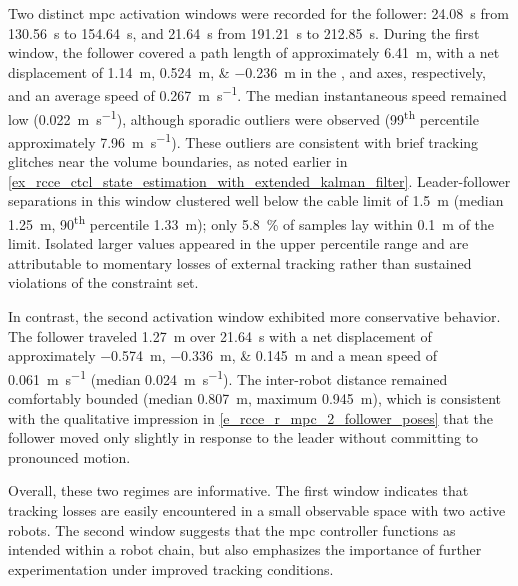 Two distinct \ac{mpc} activation windows were recorded for the follower: \qty{24.08}{\s} from
\qty{130.56}{\s} to \qty{154.64}{\s}, and \qty{21.64}{\s} from \qty{191.21}{\s} to
\qty{212.85}{\s}. During the first window, the follower covered a path length of approximately
\qty{6.41}{\meter}, with a net displacement of \qtylist{1.14;0.524;-0.236}{\meter} in the
,  and  axes, respectively, and an average speed of
\qty{0.267}{\m\per\s}. The median instantaneous speed remained low (\qty{0.022}{\m\per\s}),
although sporadic outliers were observed (\num{99}\textsuperscript{th} percentile approximately
\qty{7.96}{\m\per\s}). These outliers are consistent with brief tracking glitches near the volume
boundaries, as noted earlier in \cref{ex_rcce_ctcl_state_estimation_with_extended_kalman_filter}.
Leader-follower separations in this window clustered well below the cable limit of
\qty{1.5}{\meter} (median \qty{1.25}{\meter}, \num{90}\textsuperscript{th} percentile
\qty{1.33}{\meter}); only \qty{5.8}{\percent} of samples lay within \qty{0.1}{\meter} of the limit.
Isolated larger values appeared in the upper percentile range and are attributable to momentary
losses of external tracking rather than sustained violations of the constraint set.

In contrast, the second activation window exhibited more conservative behavior. The follower
traveled \qty{1.27}{\meter} over \qty{21.64}{\s} with a net displacement of approximately
\qtylist{-0.574;-0.336;0.145}{\meter} and a mean speed of \qty{0.061}{\m\per\s} (median
\qty{0.024}{\m\per\s}). The inter-robot distance remained comfortably bounded (median
\qty{0.807}{\meter}, maximum \qty{0.945}{\meter}), which is consistent with the qualitative
impression in \cref{e_rcce_r_mpc_2_follower_poses} that the follower moved only slightly in
response to the leader without committing to pronounced motion.

Overall, these two regimes are informative. The first window indicates that tracking losses are
easily encountered in a small observable space with two active robots. The second window suggests
that the \ac{mpc} controller functions as intended within a robot chain, but also emphasizes the
importance of further experimentation under improved tracking conditions.

